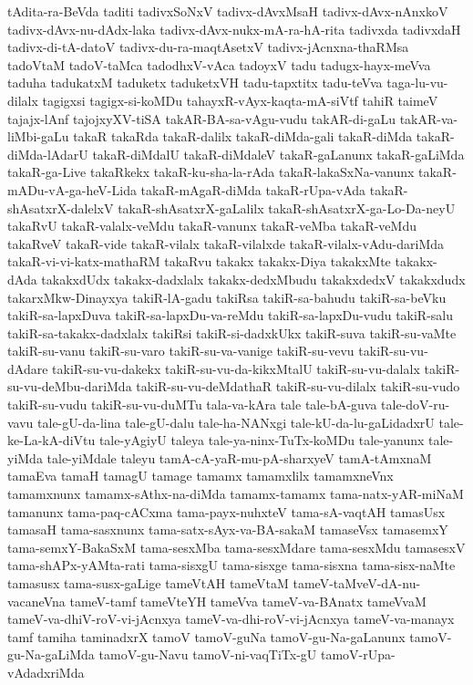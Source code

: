 {tAdita-ra-BeVda
taditi
tadivxSoNxV
tadivx-dAvxMsaH
tadivx-dAvx-nAnxkoV
tadivx-dAvx-nu-dAdx-laka
tadivx-dAvx-nukx-mA-ra-hA-rita
tadivxda
tadivxdaH
tadivx-di-tA-datoV
tadivx-du-ra-maqtAsetxV
tadivx-jAcnxna-thaRMsa
tadoVtaM
tadoV-taMca
tadodhxV-vAca
tadoyxV
tadu
tadugx-hayx-meVva
taduha
tadukatxM
taduketx
taduketxVH
tadu-tapxtitx
tadu-teVva
taga-lu-vu-dilalx
tagigxsi
tagigx-si-koMDu
tahayxR-vAyx-kaqta-mA-siVtf
tahiR
taimeV
tajajx-lAnf
tajojxyXV-tiSA
takAR-BA-sa-vAgu-vudu
takAR-di-gaLu
takAR-va-liMbi-gaLu
takaR
takaRda
takaR-dalilx
takaR-diMda-gali
takaR-diMda
takaR-diMda-lAdarU
takaR-diMdalU
takaR-diMdaleV
takaR-gaLanunx
takaR-gaLiMda
takaR-ga-Live
takaRkekx
takaR-ku-sha-la-rAda
takaR-lakaSxNa-vanunx
takaR-mADu-vA-ga-heV-Lida
takaR-mAgaR-diMda
takaR-rUpa-vAda
takaR-shAsatxrX-dalelxV
takaR-shAsatxrX-gaLalilx
takaR-shAsatxrX-ga-Lo-Da-neyU
takaRvU
takaR-valalx-veMdu
takaR-vanunx
takaR-veMba
takaR-veMdu
takaRveV
takaR-vide
takaR-vilalx
takaR-vilalxde
takaR-vilalx-vAdu-dariMda
takaR-vi-vi-katx-mathaRM
takaRvu
takakx
takakx-Diya
takakxMte
takakx-dAda
takakxdUdx
takakx-dadxlalx
takakx-dedxMbudu
takakxdedxV
takakxdudx
takarxMkw-Dinayxya
takiR-lA-gadu
takiRsa
takiR-sa-bahudu
takiR-sa-beVku
takiR-sa-lapxDuva
takiR-sa-lapxDu-va-reMdu
takiR-sa-lapxDu-vudu
takiR-salu
takiR-sa-takakx-dadxlalx
takiRsi
takiR-si-dadxkUkx
takiR-suva
takiR-su-vaMte
takiR-su-vanu
takiR-su-varo
takiR-su-va-vanige
takiR-su-vevu
takiR-su-vu-dAdare
takiR-su-vu-dakekx
takiR-su-vu-da-kikxMtalU
takiR-su-vu-dalalx
takiR-su-vu-deMbu-dariMda
takiR-su-vu-deMdathaR
takiR-su-vu-dilalx
takiR-su-vudo
takiR-su-vudu
takiR-su-vu-duMTu
tala-va-kAra
tale
tale-bA-guva
tale-doV-ru-vavu
tale-gU-da-lina
tale-gU-dalu
tale-ha-NANxgi
tale-kU-da-lu-gaLidadxrU
tale-ke-La-kA-diVtu
tale-yAgiyU
taleya
tale-ya-ninx-TuTx-koMDu
tale-yanunx
tale-yiMda
tale-yiMdale
taleyu
tamA-cA-yaR-mu-pA-sharxyeV
tamA-tAmxnaM
tamaEva
tamaH
tamagU
tamage
tamamx
tamamxlilx
tamamxneVnx
tamamxnunx
tamamx-sAthx-na-diMda
tamamx-tamamx
tama-natx-yAR-miNaM
tamanunx
tama-paq-cACxma
tama-payx-nuhxteV
tama-sA-vaqtAH
tamasUsx
tamasaH
tama-sasxnunx
tama-satx-sAyx-va-BA-sakaM
tamaseVsx
tamasemxY
tama-semxY-BakaSxM
tama-sesxMba
tama-sesxMdare
tama-sesxMdu
tamasesxV
tama-shAPx-yAMta-rati
tama-sisxgU
tama-sisxge
tama-sisxna
tama-sisx-naMte
tamasusx
tama-susx-gaLige
tameVtAH
tameVtaM
tameV-taMveV-dA-nu-vacaneVna
tameV-tamf
tameVteYH
tameVva
tameV-va-BAnatx
tameVvaM
tameV-va-dhiV-roV-vi-jAcnxya
tameV-va-dhi-roV-vi-jAcnxya
tameV-va-manayx
tamf
tamiha
taminadxrX
tamoV
tamoV-guNa
tamoV-gu-Na-gaLanunx
tamoV-gu-Na-gaLiMda
tamoV-gu-Navu
tamoV-ni-vaqTiTx-gU
tamoV-rUpa-vAdadxriMda
}
